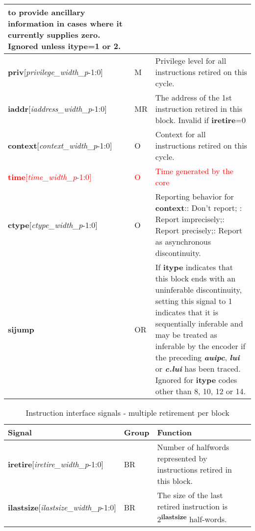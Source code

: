 \begin{table}[htp]
\begin{tabulary}{\textwidth}{|l|l|p{80mm}|}
        to provide ancillary information in cases where it currently supplies zero.
        Ignored unless \textbf{itype}=1 or 2.\\
        \hline
        \textbf{priv}[\textit{privilege\_width\_p}-1:0] & M & Privilege level for all instructions retired on this cycle.\\
        \hline
        \textbf{iaddr}[\textit{iaddress\_width\_p}-1:0] & MR & The address of the 1st instruction retired in this block.
        Invalid if \textbf{iretire}=0 \\
        \hline
        \textbf{context}[\textit{context\_width\_p}-1:0] & O & Context for all instructions retired on this cycle.\\
        \hline
        \textcolor{red}{\textbf{time}[\textit{time\_width\_p}-1:0]} & \textcolor{red}{O} & \textcolor{red}{Time generated by the core}\\
        \hline
        \textbf{ctype}[\textit{ctype\_width\_p}-1:0] & O & Reporting behavior for \textbf{context}:: Don't report; : Report imprecisely;: Report precisely;: Report as asynchronous discontinuity.\\
        \hline
        \textbf{sijump} & OR & If \textbf{itype} indicates that this block ends with an uninferable discontinuity, setting this signal to 1 
        indicates that it is sequentially inferable and may be treated as inferable by the encoder if the preceding 
        \textbf{\textit{auipc}}, \textbf{\textit{lui}} or \textbf{\textit{c.lui}} has been traced.  
        Ignored for \textbf{itype} codes other than 8, 10, 12 or 14.\\
        \hline
    \end{tabulary}
\end{table}

\begin{table}[htp]
    \centering
    \caption{Instruction interface signals - multiple retirement per block}
    \label{tab:multi-ingress}
    \begin{tabulary}{\textwidth}{|l|l|p{80mm}|}
        \hline
        \textbf{Signal} & \textbf{Group} & \textbf{Function} \\
        \hline
        \textbf{iretire}[\textit{iretire\_width\_p}-1:0] & BR & Number of halfwords represented by instructions retired in this block.\\
        \hline
        \textbf{ilastsize}[\textit{ilastsize\_width\_p}-1:0] & BR & The size of the last retired instruction is 2\textsuperscript{\textbf{ilastsize}} half-words.\\
        \hline
    \end{tabulary}
\end{table}

